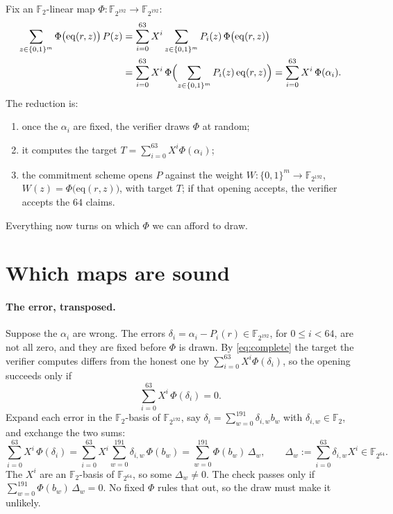 \documentclass[11pt]{article}
\newcommand{\F}{\mathbb{F}}
\newcommand{\eq}{\mathrm{eq}}
\begin{document}
Fix an $\F_2$-linear map $\Phi:\F_{2^{192}}\to\F_{2^{192}}$:
\begin{equation}
\begin{split}
\sum_{z\in\{0,1\}^m}\Phi\bigl(\eq(r,z)\bigr)\,P(z)
&=\sum_{i=0}^{63}X^i\sum_{z\in\{0,1\}^m}P_i(z)\,\Phi\bigl(\eq(r,z)\bigr)\\
&=\sum_{i=0}^{63}X^i\,\Phi\Bigl(\sum_{z\in\{0,1\}^m}P_i(z)\,\eq(r,z)\Bigr)
=\sum_{i=0}^{63}X^i\,\Phi(\alpha_i).
\end{split}
\label{eq:complete}
\end{equation}
The reduction is:
\begin{enumerate}
\item once the $\alpha_i$ are fixed, the verifier draws $\Phi$ at random;
\item it computes the target $T=\sum_{i=0}^{63}X^i\Phi(\alpha_i)$;
\item the commitment scheme opens $P$ against the weight $W:\{0,1\}^m\to\F_{2^{192}}$, $W(z)=\Phi\bigl(\eq(r,z)\bigr)$, with target $T$; if that opening accepts, the verifier accepts the $64$ claims.
\end{enumerate}
Everything now turns on which $\Phi$ we can afford to draw.

\section*{Which maps are sound}

\paragraph{The error, transposed.} Suppose the $\alpha_i$ are wrong. The errors $\delta_i=\alpha_i-P_i(r)\in\F_{2^{192}}$, for $0\le i<64$, are not all zero, and they are fixed before $\Phi$ is drawn. By \eqref{eq:complete} the target the verifier computes differs from the honest one by $\sum_{i=0}^{63}X^i\Phi(\delta_i)$, so the opening succeeds only if
\[
\sum_{i=0}^{63}X^i\,\Phi(\delta_i)=0.
\]
Expand each error in the $\F_2$-basis of $\F_{2^{192}}$, say $\delta_i=\sum_{w=0}^{191}\delta_{i,w}b_w$ with $\delta_{i,w}\in\F_2$, and exchange the two sums:
\begin{equation}
\sum_{i=0}^{63}X^i\,\Phi(\delta_i)
=\sum_{i=0}^{63}X^i\sum_{w=0}^{191}\delta_{i,w}\,\Phi(b_w)
=\sum_{w=0}^{191}\Phi(b_w)\,\Delta_w,
\qquad
\Delta_w:=\sum_{i=0}^{63}\delta_{i,w}X^i\in\F_{2^{64}}.
\label{eq:transpose}
\end{equation}
The $X^i$ are an $\F_2$-basis of $\F_{2^{64}}$, so some $\Delta_w\neq0$. The check passes only if $\sum_{w=0}^{191}\Phi(b_w)\,\Delta_w=0$. No fixed $\Phi$ rules that out, so the draw must make it unlikely.
\end{document}
